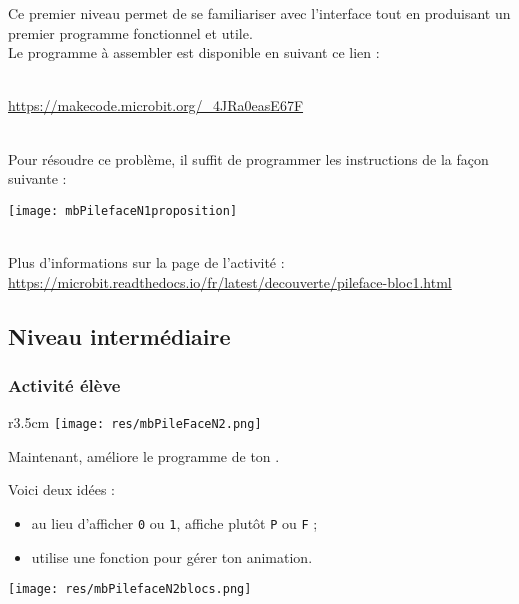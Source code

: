 Ce premier niveau permet de se familiariser avec l’interface tout en produisant un premier programme fonctionnel et utile.\\

Le programme à assembler est disponible en suivant ce lien :

~\\ \url{https://makecode.microbit.org/_4JRa0easE67F}



\begin{minipage}[t]{0.5\linewidth}
    \begin{methode}~\\
    Pour résoudre ce problème, il suffit de programmer les instructions de la façon suivante :
    
    \texttt{[image: mbPilefaceN1proposition]}
    \end{methode}
\end{minipage}
\hfill
\begin{minipage}[t]{0.5\linewidth}
    \begin{remarque}~\\
    Plus d'informations sur la page de l'activité :\\ \url{https://microbit.readthedocs.io/fr/latest/decouverte/pileface-bloc1.html}
    \end{remarque}
\end{minipage}









%
%
\newpage
\subsection{Niveau intermédiaire}
\subsubsection{Activité élève}



\begin{wrapfigure}[4]{r}{3.5cm}
    \texttt{[image: res/mbPileFaceN2.png]}
\end{wrapfigure}
\begin{eleve}
Maintenant, {\Large{améliore}} le programme de ton \mb.

Voici deux idées :
\begin{itemize}
    \item au lieu d'afficher \texttt{0} ou \texttt{1}, affiche plutôt \texttt{P} ou \texttt{F} ;
    \item utilise une fonction pour gérer ton animation.
\end{itemize}
\texttt{[image: res/mbPilefaceN2blocs.png]}
\end{eleve}


